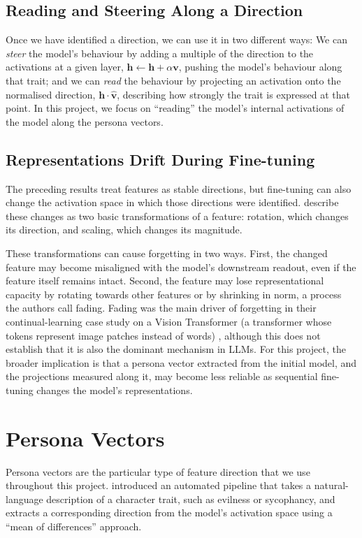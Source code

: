 \subsection{Reading and Steering Along a Direction}
\label{subsec:read_steer}

Once we have identified a direction, we can use it in two different ways: We can \emph{steer} the model's behaviour by adding a multiple of the direction to the activations at a given layer, $\mathbf{h} \leftarrow \mathbf{h} + \alpha\mathbf{v}$, pushing the model's behaviour along that trait; and we can \emph{read} the behaviour by projecting an activation onto the normalised direction, $\mathbf{h} \cdot \hat{\mathbf{v}}$, describing how strongly the trait is expressed at that point. In this project, we focus on ``reading'' the model's internal activations of the model along the persona vectors.

\subsection{Representations Drift During Fine-tuning}
\label{subsec:representation_drift}
The preceding results treat features as stable directions, but fine-tuning can also change the activation space in which those directions were identified. \citet{masip2026putting_face} describe these changes as two basic transformations of a feature: rotation, which changes its direction, and scaling, which changes its magnitude.

These transformations can cause forgetting in two ways. First, the changed feature may become misaligned with the model's downstream readout, even if the feature itself remains intact. Second, the feature may lose representational capacity by rotating towards other features or by shrinking in norm, a process the authors call fading. Fading was the main driver of forgetting in their continual-learning case study on a Vision Transformer (a transformer whose tokens represent image patches instead of words) \citep{dosovitskiy2021imageworth16x16words}, although this does not establish that it is also the dominant mechanism in LLMs. For this project, the broader implication is that a persona vector extracted from the initial model, and the projections measured along it, may become less reliable as sequential fine-tuning changes the model's representations.

\section{Persona Vectors}
\label{subsec:persona_vectors}
Persona vectors are the particular type of feature direction that we use throughout this project. \cite{chen2025persona_vectors} introduced an automated pipeline that takes a natural-language description of a character trait, such as evilness or sycophancy, and extracts a corresponding direction from the model's activation space using a ``mean of differences'' approach.


